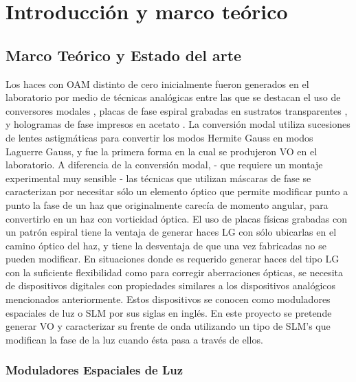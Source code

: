 

\chapter{Introducción y marco teórico}
\label{cha:Gen_intro}

\graphicspath{{Figures/ch2_img/}{../Figures/ch2_img/}}

\section{Marco Teórico y Estado del arte}
\label{sec:marco_teorico}

Los haces con OAM distinto de cero inicialmente fueron generados en el
laboratorio por medio de técnicas analógicas entre las que se destacan
el uso de conversores modales \cite{Alekseev1998}, placas de fase espiral grabadas en sustratos
transparentes \cite{Jun2009}, y hologramas de fase impresos en acetato
\cite{Carpentier2008} . La conversión modal utiliza sucesiones de
lentes astigmáticas para convertir los modos Hermite Gauss en modos
Laguerre Gauss, y fue la primera forma en la cual se produjeron VO en
el laboratorio. A diferencia de la conversión modal, - que requiere un
montaje experimental muy sensible -  las técnicas que utilizan máscaras
de fase se caracterizan por necesitar sólo un elemento óptico que
permite modificar punto a punto la fase de un haz que originalmente
carecía de momento angular, para convertirlo en un haz con vorticidad
óptica. El uso de placas físicas grabadas con un patrón espiral
tiene la ventaja de generar haces LG con sólo ubicarlas en
el camino óptico del haz, y tiene la desventaja de que una vez
fabricadas no se pueden modificar. 
En situaciones donde es requerido generar haces del tipo LG con la suficiente
flexibilidad como para corregir aberraciones ópticas, se
necesita de dispositivos digitales con propiedades similares a los
dispositivos analógicos mencionados anteriormente. Estos dispositivos
se conocen como moduladores espaciales de luz o SLM por sus siglas en
inglés. En este proyecto se pretende generar VO y caracterizar su
frente de onda utilizando un tipo de SLM's que modifican la fase de la
luz cuando ésta pasa a través de ellos. 

\subsection{Moduladores Espaciales de Luz}

